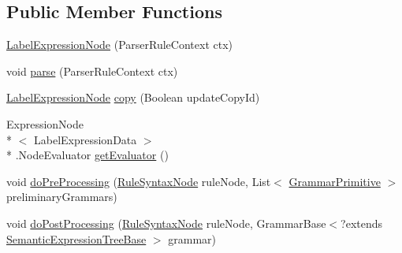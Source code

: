 \subsection*{Public Member Functions}
\begin{DoxyCompactItemize}
\item 
\hyperlink{classit_1_1emarolab_1_1cagg_1_1core_1_1language_1_1syntax_1_1expressionTree_1_1expressionNodeType_1_1LabelExpressionNode_ab825a75e35fd8f1d8412003dbdb3bb1c}{Label\-Expression\-Node} (Parser\-Rule\-Context ctx)
\item 
void \hyperlink{classit_1_1emarolab_1_1cagg_1_1core_1_1language_1_1syntax_1_1expressionTree_1_1expressionNodeType_1_1LabelExpressionNode_aee122a974b807dd2c84d0114d2a7a0d2}{parse} (Parser\-Rule\-Context ctx)
\item 
\hyperlink{classit_1_1emarolab_1_1cagg_1_1core_1_1language_1_1syntax_1_1expressionTree_1_1expressionNodeType_1_1LabelExpressionNode}{Label\-Expression\-Node} \hyperlink{classit_1_1emarolab_1_1cagg_1_1core_1_1language_1_1syntax_1_1expressionTree_1_1expressionNodeType_1_1LabelExpressionNode_a1bf433d4634ea5a327dffb2c3fe5453f}{copy} (Boolean update\-Copy\-Id)
\item 
Expression\-Node\\*
$<$ Label\-Expression\-Data $>$\\*
.Node\-Evaluator \hyperlink{classit_1_1emarolab_1_1cagg_1_1core_1_1language_1_1syntax_1_1expressionTree_1_1expressionNodeType_1_1LabelExpressionNode_a16dc5d11590db483088f6f5ae80cc3d1}{get\-Evaluator} ()
\item 
void \hyperlink{classit_1_1emarolab_1_1cagg_1_1core_1_1language_1_1syntax_1_1expressionTree_1_1expressionNodeType_1_1LabelExpressionNode_a4fba23771375932b07c069776fc2fe8d}{do\-Pre\-Processing} (\hyperlink{classit_1_1emarolab_1_1cagg_1_1core_1_1language_1_1syntax_1_1abstractTree_1_1syntaxNodeType_1_1RuleSyntaxNode}{Rule\-Syntax\-Node} rule\-Node, List$<$ \hyperlink{classit_1_1emarolab_1_1cagg_1_1core_1_1language_1_1syntax_1_1GrammarPrimitive}{Grammar\-Primitive} $>$ preliminary\-Grammars)
\item 
void \hyperlink{classit_1_1emarolab_1_1cagg_1_1core_1_1language_1_1syntax_1_1expressionTree_1_1expressionNodeType_1_1LabelExpressionNode_a9a0f3743c323627183872a5e98c10d24}{do\-Post\-Processing} (\hyperlink{classit_1_1emarolab_1_1cagg_1_1core_1_1language_1_1syntax_1_1abstractTree_1_1syntaxNodeType_1_1RuleSyntaxNode}{Rule\-Syntax\-Node} rule\-Node, Grammar\-Base$<$?extends \hyperlink{interfaceit_1_1emarolab_1_1cagg_1_1core_1_1evaluation_1_1semanticGrammar_1_1syntaxCompiler_1_1SemanticExpressionTreeBase}{Semantic\-Expression\-Tree\-Base} $>$ grammar)
\end{DoxyCompactItemize}
